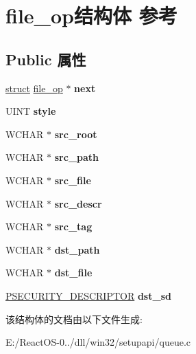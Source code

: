 \hypertarget{structfile__op}{}\section{file\+\_\+op结构体 参考}
\label{structfile__op}
\subsection*{Public 属性}
\begin{DoxyCompactItemize}
\item 
\mbox{\label{structfile__op_aca3bb531d693ef11461afd0ab83153a5}} 
\hyperlink{interfacestruct}{struct} \hyperlink{structfile__op}{file\+\_\+op} $\ast$ {\bfseries next}
\item 
\mbox{\label{structfile__op_a5dc53086aa6d1b7f9f07e7f1a0fd8fd5}} 
U\+I\+NT {\bfseries style}
\item 
\mbox{\label{structfile__op_a1b60b2c1b9e03f7bc8497ca91662906a}} 
W\+C\+H\+AR $\ast$ {\bfseries src\+\_\+root}
\item 
\mbox{\label{structfile__op_a0e28d72b35b07743d7e5c4fdff89be8e}} 
W\+C\+H\+AR $\ast$ {\bfseries src\+\_\+path}
\item 
\mbox{\label{structfile__op_ae6a2e3f32f6366e591f14f9c290d4f28}} 
W\+C\+H\+AR $\ast$ {\bfseries src\+\_\+file}
\item 
\mbox{\label{structfile__op_a1c27228b063151a4b788dc7a934ffdf4}} 
W\+C\+H\+AR $\ast$ {\bfseries src\+\_\+descr}
\item 
\mbox{\label{structfile__op_a4df83f39310a4d6dfe1e568e7925e1a5}} 
W\+C\+H\+AR $\ast$ {\bfseries src\+\_\+tag}
\item 
\mbox{\label{structfile__op_a97ce706788729cdc5a578ae76e8d7d0e}} 
W\+C\+H\+AR $\ast$ {\bfseries dst\+\_\+path}
\item 
\mbox{\label{structfile__op_a79e0a6003aa914f1051b9b853827c3a9}} 
W\+C\+H\+AR $\ast$ {\bfseries dst\+\_\+file}
\item 
\mbox{\label{structfile__op_ab1a8842c74b377e7e2e730806491aa03}} 
\hyperlink{struct___s_e_c_u_r_i_t_y___d_e_s_c_r_i_p_t_o_r}{P\+S\+E\+C\+U\+R\+I\+T\+Y\+\_\+\+D\+E\+S\+C\+R\+I\+P\+T\+OR} {\bfseries dst\+\_\+sd}
\end{DoxyCompactItemize}


该结构体的文档由以下文件生成\+:\begin{DoxyCompactItemize}
\item 
E\+:/\+React\+O\+S-\/0../dll/win32/setupapi/queue.\+c\end{DoxyCompactItemize}
